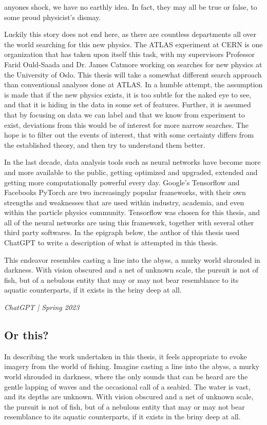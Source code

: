 anyones shock, we have no earthly idea. In fact, they may all be true or false, to some proud 
physicist's dismay. \par Luckily this story does not end here, as there are countless departments all 
over the world searching for this new physics. The ATLAS experiment at CERN is one organization that 
has taken upon itself this task, with my supervisors Professor Farid Ould-Saada and Dr. James Catmore working 
on searches for new physics at the University of Oslo. This thesis will take a somewhat different search 
approach than conventional analyses done at ATLAS. In a humble attempt, the assumption is made that 
if the new physics exists, it is too subtle for the naked eye to see, and that it is hiding in the data
in some set of features. Further, it is assumed that by focusing on data we can label and that we know 
from experiment to exist, deviations from this would be of interest for more narrow searches. The hope is 
to filter out the events of interest, that with some certainty differs from the established theory, 
and then try to understand them better. \par 
In the last decade, data analysis tools such as neural networks have become more and more available 
to the public, getting optimized and upgraded, extended and getting more computationally powerful every 
day. Google's Tensorflow\cite{tensorflow2015-whitepaper} and Facebooks PyTorch\cite{paszke2019pytorch} 
are two increasingly popular frameworks, with their own strengths and weaknesses that are used within industry, 
academia, and even within the particle physics community. Tensorflow was chosen for this thesis, and 
all of the neural networks are using this framework, together with several other third party softwares. 
In the epigraph below, the author of this thesis used ChatGPT to write a description of what is 
attempted in this thesis. 

\epigraph{
    This endeavor resembles casting a line into the abyss, a murky world 
shrouded in darkness. With vision obscured and a net of unknown scale, 
the pursuit is not of fish, but of a nebulous entity that may or may 
not bear resemblance to its aquatic counterparts, if it exists in 
the briny deep at all.}{\textit{ChatGPT | Spring 2023}}

\par \par 
\subsection*{Or this?}
In describing the work undertaken in this thesis, it feels appropriate to evoke imagery from the world of fishing. Imagine casting a line into the abyss, a murky world shrouded in darkness, where the only sounds that can be heard are the gentle lapping of waves and the occasional call of a seabird. The water is vast, and its depths are unknown. With vision obscured and a net of unknown scale, the pursuit is not of fish, but of a nebulous entity that may or may not bear resemblance to its aquatic counterparts, if it exists in the briny deep at all.

